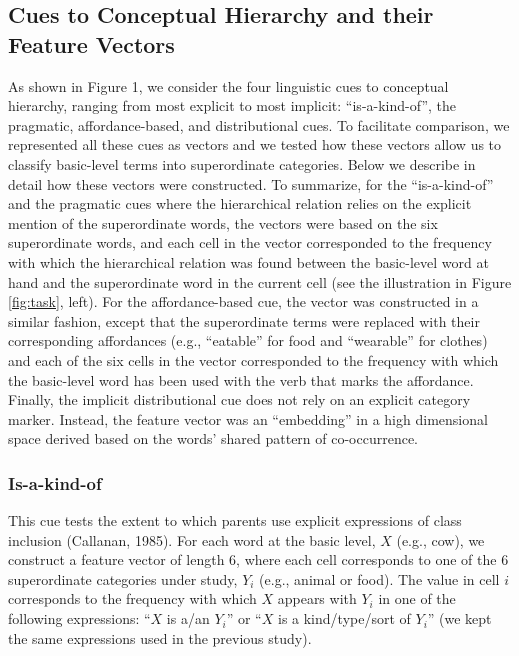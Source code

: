 \documentclass[english,,man]{apa6}
\begin{document}
\hypertarget{cues-to-conceptual-hierarchy-and-their-feature-vectors}{%
\subsection{Cues to Conceptual Hierarchy and their Feature Vectors}\label{cues-to-conceptual-hierarchy-and-their-feature-vectors}}

As shown in Figure 1, we consider the four linguistic cues to conceptual hierarchy, ranging from most explicit to most implicit: \enquote{is-a-kind-of}, the pragmatic, affordance-based, and distributional cues. To facilitate comparison, we represented all these cues as vectors and we tested how these vectors allow us to classify basic-level terms into superordinate categories. Below we describe in detail how these vectors were constructed. To summarize, for the \enquote{is-a-kind-of} and the pragmatic cues where the hierarchical relation relies on the explicit mention of the superordinate words, the vectors were based on the six superordinate words, and each cell in the vector corresponded to the frequency with which the hierarchical relation was found between the basic-level word at hand and the superordinate word in the current cell (see the illustration in Figure \ref{fig:task}, left). For the affordance-based cue, the vector was constructed in a similar fashion, except that the superordinate terms were replaced with their corresponding affordances (e.g., \enquote{eatable} for food and \enquote{wearable} for clothes) and each of the six cells in the vector corresponded to the frequency with which the basic-level word has been used with the verb that marks the affordance. Finally, the implicit distributional cue does not rely on an explicit category marker. Instead, the feature vector was an \enquote{embedding} in a high dimensional space derived based on the words' shared pattern of co-occurrence.

\hypertarget{is-a-kind-of}{%
\subsubsection{Is-a-kind-of}\label{is-a-kind-of}}

This cue tests the extent to which parents use explicit expressions of class inclusion (Callanan, 1985). For each word at the basic level, \(X\) (e.g., cow),
we construct a feature vector of length 6, where each cell corresponds to one of the 6 superordinate categories under study, \(Y_i\) (e.g., animal or food). The value in cell \(i\) corresponds to the frequency with which \(X\) appears with \(Y_i\) in one of the following expressions: \enquote{\(X\) is a/an \(Y_i\)} or \enquote{\(X\) is a kind/type/sort of \(Y_i\)} (we kept the same expressions used in the previous study).
\end{document}
